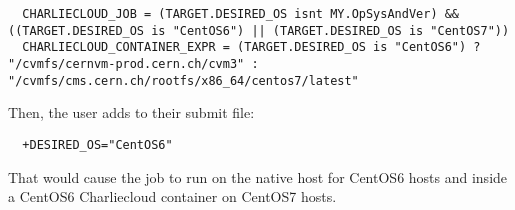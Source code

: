 \begin{verbatim}
  CHARLIECLOUD_JOB = (TARGET.DESIRED_OS isnt MY.OpSysAndVer) && ((TARGET.DESIRED_OS is "CentOS6") || (TARGET.DESIRED_OS is "CentOS7"))
  CHARLIECLOUD_CONTAINER_EXPR = (TARGET.DESIRED_OS is "CentOS6") ? "/cvmfs/cernvm-prod.cern.ch/cvm3" : "/cvmfs/cms.cern.ch/rootfs/x86_64/centos7/latest"
\end{verbatim}

Then, the user adds to their submit file:

\begin{verbatim}
  +DESIRED_OS="CentOS6"
\end{verbatim}

That would cause the job to run on the native host for CentOS6 hosts
and inside a CentOS6 Charliecloud container on CentOS7 hosts.
